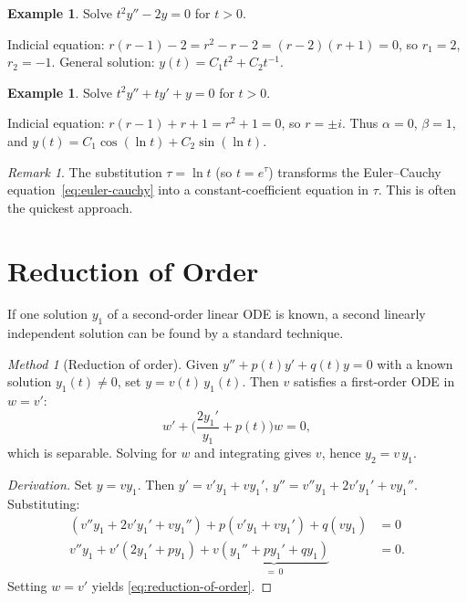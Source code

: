\documentclass[12pt,a4paper,openany]{book}
\theoremstyle{definition}
\newtheorem{example}[definition]{Example}
\theoremstyle{plain}
\theoremstyle{remark}
\newtheorem{remark}[definition]{Remark}
\newtheorem{method}[definition]{Method}
\begin{document}
\begin{example}\label{ex:euler-cauchy-1}
Solve $t^2 y'' - 2y = 0$ for $t > 0$.

Indicial equation: $r(r-1) - 2 = r^2 - r - 2 = (r-2)(r+1) = 0$, so
$r_1 = 2$, $r_2 = -1$. General solution: $y(t) = C_1 t^2 + C_2 t^{-1}$.
\end{example}

\begin{example}\label{ex:euler-cauchy-2}
Solve $t^2 y'' + ty' + y = 0$ for $t > 0$.

Indicial equation: $r(r-1) + r + 1 = r^2 + 1 = 0$, so $r = \pm i$.
Thus $\alpha = 0$, $\beta = 1$, and
$y(t) = C_1\cos(\ln t) + C_2\sin(\ln t)$.
\end{example}

\begin{remark}\label{rem:euler-cauchy-substitution}
The substitution $\tau = \ln t$ (so $t = e^\tau$) transforms the Euler--Cauchy
equation~\eqref{eq:euler-cauchy} into a constant-coefficient equation in $\tau$.
This is often the quickest approach.
\end{remark}

\section{Reduction of Order}\label{sec:reduction-of-order}

If one solution $y_1$ of a second-order linear ODE is known, a second
linearly independent solution can be found by a standard technique.

\begin{method}[Reduction of order]\label{meth:reduction-of-order}
Given $y'' + p(t)y' + q(t)y = 0$ with a known solution $y_1(t) \ne 0$,
set $y = v(t)\,y_1(t)$. Then $v$ satisfies a first-order ODE in $w = v'$:
\begin{equation}\label{eq:reduction-of-order}
  w' + \biggl(\frac{2y_1'}{y_1} + p(t)\biggr)w = 0,
\end{equation}
which is separable. Solving for $w$ and integrating gives $v$, hence
$y_2 = v\,y_1$.
\end{method}

\begin{proof}[Derivation]
Set $y = vy_1$. Then $y' = v'y_1 + vy_1'$,
$y'' = v''y_1 + 2v'y_1' + vy_1''$. Substituting:
\begin{align*}
  (v''y_1 + 2v'y_1' + vy_1'') + p(v'y_1 + vy_1') + q(vy_1) &= 0 \\
  v''y_1 + v'(2y_1' + py_1) + v\underbrace{(y_1'' + py_1' + qy_1)}_{=\,0} &= 0.
\end{align*}
Setting $w = v'$ yields \eqref{eq:reduction-of-order}.
\end{proof}
\end{document}
